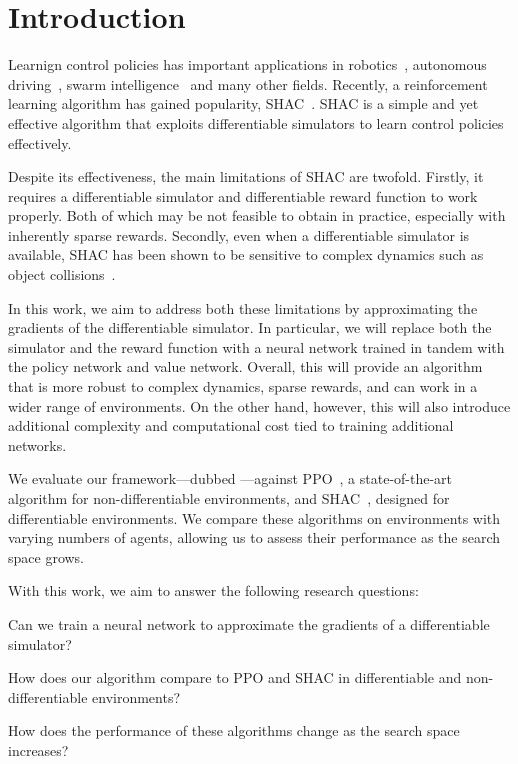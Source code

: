 \section{Introduction}

Learnign control policies has important applications in robotics~\cite{Singh22}, autonomous driving~\cite{Elallid22}, swarm intelligence~\cite{Tang21} and many other fields. Recently, a reinforcement learning algorithm has gained popularity, SHAC~\cite{Xu22}. SHAC is a simple and yet effective algorithm that exploits differentiable simulators to learn control policies effectively. 

Despite its effectiveness, the main limitations of SHAC are twofold. Firstly, it requires a differentiable simulator and differentiable reward function to work properly. Both of which may be not feasible to obtain in practice, especially with inherently sparse rewards. Secondly, even when a differentiable simulator is available, SHAC has been shown to be sensitive to complex dynamics such as object collisions~\cite{Georgiev24}.

In this work, we aim to address both these limitations by approximating the gradients of the differentiable simulator. In particular, we will replace both the simulator and the reward function with a neural network trained in tandem with the policy network and value network. Overall, this will provide an algorithm that is more robust to complex dynamics, sparse rewards, and can work in a wider range of environments. On the other hand, however, this will also introduce additional complexity and computational cost tied to training additional networks.

We evaluate our framework---dubbed \fname{}---against PPO~\cite{Schulman17}, a state-of-the-art algorithm for non-differentiable environments, and SHAC~\cite{Xu22}, designed for differentiable environments. We compare these algorithms on environments with varying numbers of agents, allowing us to assess their performance as the search space grows.

With this work, we aim to answer the following research questions:
\begin{compactitem}
    \item {} Can we train a neural network to approximate the gradients of a differentiable simulator?
    \item {} How does our algorithm compare to PPO and SHAC in differentiable and non-differentiable environments?
    \item {} How does the performance of these algorithms change as the search space increases?
\end{compactitem}

